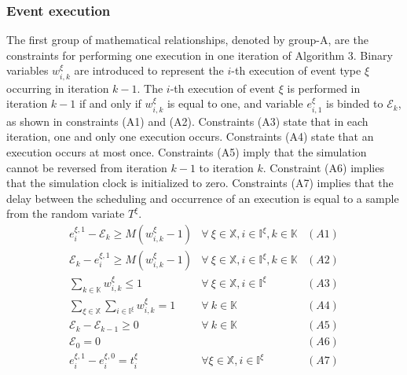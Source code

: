 \documentclass[suppldata]{interact}
\theoremstyle{plain}
\theoremstyle{definition}
\theoremstyle{remark}
\begin{document}
\subsubsection{Event execution} \label{sec:const_A}
The first group of mathematical relationships, denoted by group-A, are the constraints for performing one execution in one iteration of Algorithm 3. Binary variables $w^{\xi}_{i,k}$ are introduced to represent the $i$-th execution of event type $\xi$ occurring in iteration $k-1$. The $i$-th execution of event $\xi$ is performed in iteration $k-1$ if and only if $w^{\xi}_{i,k}$ is equal to one, and variable $e^{\xi}_{i,1}$ is binded to $\mathcal{E}_k$, as shown in constraints (A1) and (A2). Constraints (A3) state that in each iteration, one and only one execution occurs. Constraints (A4) state that an execution occurs at most once. 
Constraints (A5) imply that the simulation cannot be reversed from iteration $k-1$ to iteration $k$. 
Constraint (A6) implies that the simulation clock is initialized to zero. Constraints (A7) implies that the delay between the scheduling and occurrence of an execution is equal to a sample from the random variate $T^{\xi}$.
\begin{eqnarray}
	e^{\xi,1}_i-\mathcal{E}_k\ge M(w^{\xi}_{i,k}-1) & \forall\ \xi\in\mathbb{X},i\in \mathbb{I}^{\xi},k\in \mathbb{K}&(A1)\nonumber\\
	\mathcal{E}_k-e^{\xi,1}_i\ge M(w^{\xi}_{i,k}-1) & \forall\ \xi\in\mathbb{X},i\in \mathbb{I}^{\xi},k\in \mathbb{K}&(A2)\nonumber\\
	\sum_{k\in \mathbb{K}} w^{\xi}_{i,k} \le 1& \forall\ \xi\in\mathbb{X},i\in \mathbb{I}^{\xi}&(A3)\nonumber\\
	\sum_{\xi\in \mathbb{X}}\sum_{i\in \mathbb{I}^{\xi}} w^{\xi}_{i,k} =1&\forall\ k\in \mathbb{K}&(A4)\nonumber\\
	\mathcal{E}_{k}-\mathcal{E}_{k-1}\ge 0&\forall\ k\in \mathbb{K}&(A5)\nonumber\\
	\mathcal{E}_0 = 0&&(A6)\nonumber\\
	e^{\xi,1}_{i} - e^{\xi,0}_{i} = t^{\xi}_{i} & \forall \xi\in\mathbb{X}, i\in \mathbb{I}^{\xi}&(A7) \nonumber
\end{eqnarray}
\end{document}
